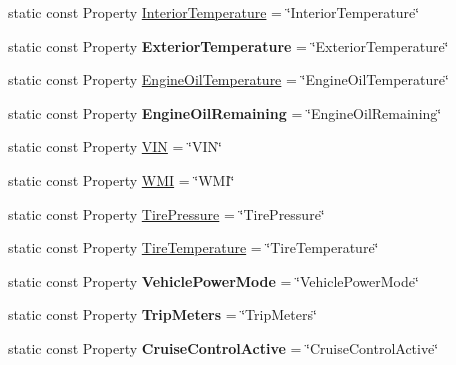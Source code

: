 \begin{DoxyCompactItemize}
\item 
static const Property \hyperlink{classVehicleProperty_adbbb68033f8531903ff3e3024864eef3}{Interior\-Temperature} = \char`\"{}Interior\-Temperature\char`\"{}
\item 
\hypertarget{classVehicleProperty_ad9510186dc9ef236b59743371f093d36}{static const Property {\bfseries Exterior\-Temperature} = \char`\"{}Exterior\-Temperature\char`\"{}}\label{classVehicleProperty_ad9510186dc9ef236b59743371f093d36}

\item 
static const Property \hyperlink{classVehicleProperty_a9d4a610d94b12f139ea00b271804a73f}{Engine\-Oil\-Temperature} = \char`\"{}Engine\-Oil\-Temperature\char`\"{}
\item 
\hypertarget{classVehicleProperty_aeeece192dedcd20cb112dea6905aa80c}{static const Property {\bfseries Engine\-Oil\-Remaining} = \char`\"{}Engine\-Oil\-Remaining\char`\"{}}\label{classVehicleProperty_aeeece192dedcd20cb112dea6905aa80c}

\item 
static const Property \hyperlink{classVehicleProperty_ae72c1c7de185f330862c62dfb9d93a34}{V\-I\-N} = \char`\"{}V\-I\-N\char`\"{}
\item 
static const Property \hyperlink{classVehicleProperty_a32f980d900d97cf94171ea9fa25408e0}{W\-M\-I} = \char`\"{}W\-M\-I\char`\"{}
\item 
static const Property \hyperlink{classVehicleProperty_a4709c7da616ca84dd4533562319d9bb8}{Tire\-Pressure} = \char`\"{}Tire\-Pressure\char`\"{}
\item 
static const Property \hyperlink{classVehicleProperty_a6ec2a936e26226d1cb9fb84262e6adc2}{Tire\-Temperature} = \char`\"{}Tire\-Temperature\char`\"{}
\item 
\hypertarget{classVehicleProperty_a80cc1f343da6754346e4bcc0cc7ae009}{static const Property {\bfseries Vehicle\-Power\-Mode} = \char`\"{}Vehicle\-Power\-Mode\char`\"{}}\label{classVehicleProperty_a80cc1f343da6754346e4bcc0cc7ae009}

\item 
\hypertarget{classVehicleProperty_a893b05cb0e292082070458efa6066e91}{static const Property {\bfseries Trip\-Meters} = \char`\"{}Trip\-Meters\char`\"{}}\label{classVehicleProperty_a893b05cb0e292082070458efa6066e91}

\item 
\hypertarget{classVehicleProperty_a3203c1cb22ff3b530a887228096863e5}{static const Property {\bfseries Cruise\-Control\-Active} = \char`\"{}Cruise\-Control\-Active\char`\"{}}\label{classVehicleProperty_a3203c1cb22ff3b530a887228096863e5}


\end{DoxyCompactItemize}

